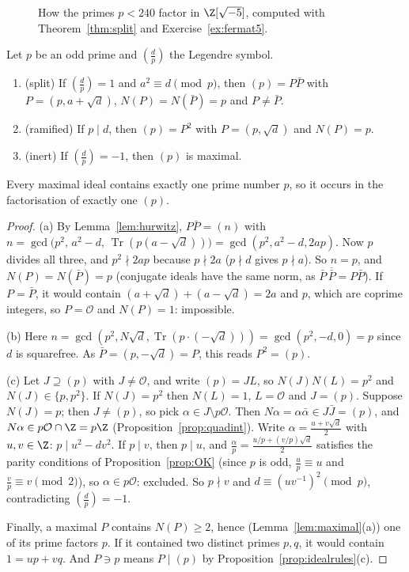 \begin{figure}[ht]
\centering
{}
\caption{How the primes $p<240$ factor in $\Z[\sqrt{-5}]$, computed with Theorem~\ref{thm:split} and Exercise~\ref{ex:fermat5}.}
\label{fig:split}
\end{figure}

\begin{theorem}\label{thm:split}
Let $p$ be an odd prime and $\left(\frac dp\right)$ the Legendre symbol.
\begin{enumerate}[label=(\alph*)]
\item (split) If $\left(\frac dp\right)=1$ and $a^2\equiv d\pmod p$, then $(p)=P\bar P$ with $P=(p,a+\sqrt d)$, $N(P)=N(\bar P)=p$ and $P\ne\bar P$.
\item (ramified) If $p\mid d$, then $(p)=P^2$ with $P=(p,\sqrt d)$ and $N(P)=p$.
\item (inert) If $\left(\frac dp\right)=-1$, then $(p)$ is maximal.
\end{enumerate}
Every maximal ideal contains exactly one prime number $p$, so it occurs in the factorisation of exactly one $(p)$.
\end{theorem}
\begin{proof}
(a) By Lemma~\ref{lem:hurwitz}, $P\bar P=(n)$ with $n=\gcd\big(p^2,\,a^2-d,\,\operatorname{Tr}(p(a-\sqrt d))\big)=\gcd(p^2,a^2-d,2ap)$. Now $p$ divides all three, and $p^2\nmid2ap$ because $p\nmid2a$ ($p\nmid d$ gives $p\nmid a$). So $n=p$, and $N(P)=N(\bar P)=p$ (conjugate ideals have the same norm, as $\bar P\,\overline{\bar P}=P\bar P$). If $P=\bar P$, it would contain $(a+\sqrt d)+(a-\sqrt d)=2a$ and $p$, which are coprime integers, so $P=\mathcal O$ and $N(P)=1$: impossible.

(b) Here $n=\gcd(p^2,N\sqrt d,\operatorname{Tr}(p\cdot(-\sqrt d)))=\gcd(p^2,-d,0)=p$ since $d$ is squarefree. As $\bar P=(p,-\sqrt d)=P$, this reads $P^2=(p)$.

(c) Let $J\supseteq(p)$ with $J\ne\mathcal O$, and write $(p)=JL$, so $N(J)N(L)=p^2$ and $N(J)\in\{p,p^2\}$. If $N(J)=p^2$ then $N(L)=1$, $L=\mathcal O$ and $J=(p)$. Suppose $N(J)=p$; then $J\ne(p)$, so pick $\alpha\in J\setminus p\mathcal O$. Then $N\alpha=\alpha\bar\alpha\in J\bar J=(p)$, and $N\alpha\in p\mathcal O\cap\Z=p\Z$ (Proposition~\ref{prop:quadint}). Write $\alpha=\frac{u+v\sqrt d}2$ with $u,v\in\Z$: $p\mid u^2-dv^2$. If $p\mid v$, then $p\mid u$, and $\frac\alpha p=\frac{u/p+(v/p)\sqrt d}2$ satisfies the parity conditions of Proposition~\ref{prop:OK} (since $p$ is odd, $\frac up\equiv u$ and $\frac vp\equiv v\pmod2$), so $\alpha\in p\mathcal O$: excluded. So $p\nmid v$ and $d\equiv(uv^{-1})^2\pmod p$, contradicting $\left(\frac dp\right)=-1$.

Finally, a maximal $P$ contains $N(P)\ge2$, hence (Lemma~\ref{lem:maximal}(a)) one of its prime factors $p$. If it contained two distinct primes $p,q$, it would contain $1=up+vq$. And $P\ni p$ means $P\mid(p)$ by Proposition~\ref{prop:idealrules}(c).
\end{proof}

